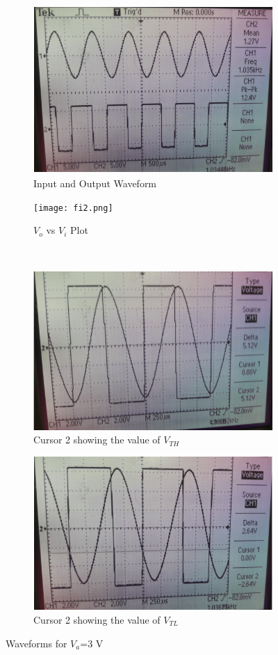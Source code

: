 \documentclass[12pt]{article}
\begin{document}
\begin{figure}[h]
\centering
\begin{subfigure}{.5\textwidth}
  \centering
  \includegraphics[width=.8\linewidth]{fi1.png}
  \caption{Input and Output Waveform}
  \label{fig:sub1}
\end{subfigure}%
\begin{subfigure}{.5\textwidth}
  \centering
  \texttt{[image: fi2.png]}
  \caption{$V_{o}$ vs $V_{i}$ Plot}
  \label{fig:sub1}
\end{subfigure}%
\\
\begin{subfigure}{.5\textwidth}
  \centering
  \includegraphics[width=.8\linewidth]{fi3.png}
  \caption{Cursor 2 showing the value of $V_{TH}$}
  \label{fig:sub2}
\end{subfigure}%
\begin{subfigure}{.5\textwidth}
  \centering
  \includegraphics[width=.8\linewidth]{fi4.png}
  \caption{Cursor 2 showing the value of $V_{TL}$}
  \label{fig:sub2}
\end{subfigure}
\caption{Waveforms for $V_{a}$=3 V}
\end{figure}
\end{document}
